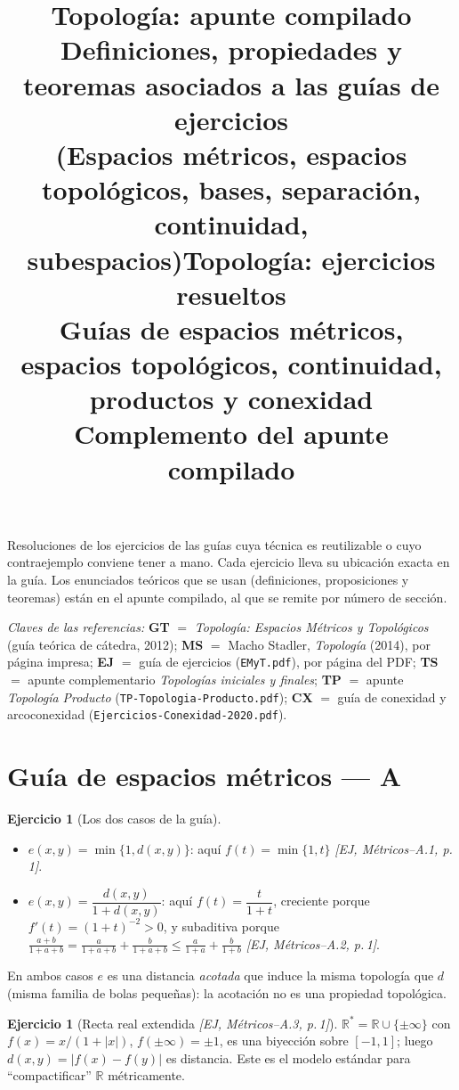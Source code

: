 \documentclass[11pt,a4paper]{article}
\title{\textbf{Topología: apunte compilado}\\[2pt]
\large Definiciones, propiedades y teoremas asociados a las guías de ejercicios\\
\normalsize (Espacios métricos, espacios topológicos, bases, separación, continuidad, subespacios)}
\author{}
\date{}
\title{\textbf{Topología: ejercicios resueltos}\\[2pt]
\large Guías de espacios métricos, espacios topológicos, continuidad, productos y conexidad\\
\normalsize Complemento del apunte compilado}
\author{}
\date{}
\theoremstyle{definition}
\newtheorem{ejercicio}[definicion]{Ejercicio}
\theoremstyle{plain}
\newcommand{\fnt}[1]{{\normalfont\small\itshape\color{gray!150!black}[#1]}}
\newcommand{\R}{\mathbb{R}}
\begin{document}
\maketitle
\vspace{-2.2em}

\noindent Resoluciones de los ejercicios de las guías cuya técnica es reutilizable o cuyo contraejemplo conviene tener a mano. Cada ejercicio lleva su ubicación exacta en la guía. Los enunciados teóricos que se usan (definiciones, proposiciones y teoremas) están en el apunte compilado, al que se remite por número de sección.

\medskip
\noindent\emph{Claves de las referencias:} \textbf{GT} $=$ \emph{Topología: Espacios Métricos y Topológicos} (guía teórica de cátedra, 2012); \textbf{MS} $=$ Macho Stadler, \emph{Topología} (2014), por página impresa; \textbf{EJ} $=$ guía de ejercicios (\texttt{EMyT.pdf}), por página del PDF; \textbf{TS} $=$ apunte complementario \emph{Topologías iniciales y finales}; \textbf{TP} $=$ apunte \emph{Topología Producto} (\texttt{TP-Topologia-Producto.pdf}); \textbf{CX} $=$ guía de conexidad y arcoconexidad (\texttt{Ejercicios-Conexidad-2020.pdf}).

\tableofcontents





\section{Guía de espacios métricos --- A}

\begin{ejercicio}[Los dos casos de la guía]
\begin{itemize}[leftmargin=1.4em,itemsep=1pt]
\item $e(x,y)=\min\{1,d(x,y)\}$: aquí $f(t)=\min\{1,t\}$ \fnt{EJ, Métricos--A.1, p.\,1}.
\item $e(x,y)=\dfrac{d(x,y)}{1+d(x,y)}$: aquí $f(t)=\dfrac{t}{1+t}$, creciente porque $f'(t)=(1+t)^{-2}>0$, y subaditiva porque
$\frac{a+b}{1+a+b}=\frac{a}{1+a+b}+\frac{b}{1+a+b}\le \frac{a}{1+a}+\frac{b}{1+b}$ \fnt{EJ, Métricos--A.2, p.\,1}.
\end{itemize}
En ambos casos $e$ es una distancia \emph{acotada} que induce la misma topología que $d$ (misma familia de bolas pequeñas): la acotación no es una propiedad topológica.
\end{ejercicio}

\begin{ejercicio}[Recta real extendida \fnt{EJ, Métricos--A.3, p.\,1}]
$\R^*=\R\cup\{\pm\infty\}$ con $f(x)=x/(1+|x|)$, $f(\pm\infty)=\pm1$, es una biyección sobre $[-1,1]$; luego $d(x,y)=|f(x)-f(y)|$ es distancia. Este es el modelo estándar para ``compactificar'' $\R$ métricamente.
\end{ejercicio}
\end{document}

